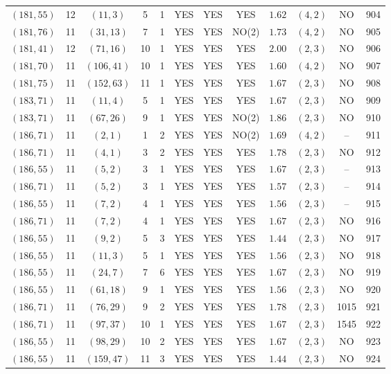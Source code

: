 \begin{longtable}{|c|c|c|c|c|c|c|c|c|c|c|c|}
$(181,55)$ & 12 & $(11,3)$ & 5 & 1 & YES & YES & YES & $1.62$ & $(4,2)$ & NO & 904\\
$(181,76)$ & 11 & $(31,13)$ & 7 & 1 & YES & YES & NO(2) & $1.73$ & $(4,2)$ & NO & 905\\
$(181,41)$ & 12 & $(71,16)$ & 10 & 1 & YES & YES & YES & $2.00$ & $(2,3)$ & NO & 906\\
$(181,70)$ & 11 & $(106,41)$ & 10 & 1 & YES & YES & YES & $1.60$ & $(4,2)$ & NO & 907\\
$(181,75)$ & 11 & $(152,63)$ & 11 & 1 & YES & YES & YES & $1.67$ & $(2,3)$ & NO & 908\\
$(183,71)$ & 11 & $(11,4)$ & 5 & 1 & YES & YES & YES & $1.67$ & $(2,3)$ & NO & 909\\
$(183,71)$ & 11 & $(67,26)$ & 9 & 1 & YES & YES & NO(2) & $1.86$ & $(2,3)$ & NO & 910\\
$(186,71)$ & 11 & $(2,1)$ & 1 & 2 & YES & YES & NO(2) & $1.69$ & $(4,2)$ & -- & 911\\
$(186,71)$ & 11 & $(4,1)$ & 3 & 2 & YES & YES & YES & $1.78$ & $(2,3)$ & NO & 912\\
$(186,55)$ & 11 & $(5,2)$ & 3 & 1 & YES & YES & YES & $1.67$ & $(2,3)$ & -- & 913\\
$(186,71)$ & 11 & $(5,2)$ & 3 & 1 & YES & YES & YES & $1.57$ & $(2,3)$ & -- & 914\\
$(186,55)$ & 11 & $(7,2)$ & 4 & 1 & YES & YES & YES & $1.56$ & $(2,3)$ & -- & 915\\
$(186,71)$ & 11 & $(7,2)$ & 4 & 1 & YES & YES & YES & $1.67$ & $(2,3)$ & NO & 916\\
$(186,55)$ & 11 & $(9,2)$ & 5 & 3 & YES & YES & YES & $1.44$ & $(2,3)$ & NO & 917\\
$(186,55)$ & 11 & $(11,3)$ & 5 & 1 & YES & YES & YES & $1.56$ & $(2,3)$ & NO & 918\\
$(186,55)$ & 11 & $(24,7)$ & 7 & 6 & YES & YES & YES & $1.67$ & $(2,3)$ & NO & 919\\
$(186,55)$ & 11 & $(61,18)$ & 9 & 1 & YES & YES & YES & $1.56$ & $(2,3)$ & NO & 920\\
$(186,71)$ & 11 & $(76,29)$ & 9 & 2 & YES & YES & YES & $1.78$ & $(2,3)$ & 1015 & 921\\
$(186,71)$ & 11 & $(97,37)$ & 10 & 1 & YES & YES & YES & $1.67$ & $(2,3)$ & 1545 & 922\\
$(186,55)$ & 11 & $(98,29)$ & 10 & 2 & YES & YES & YES & $1.67$ & $(2,3)$ & NO & 923\\
$(186,55)$ & 11 & $(159,47)$ & 11 & 3 & YES & YES & YES & $1.44$ & $(2,3)$ & NO & 924\\

\end{longtable}
